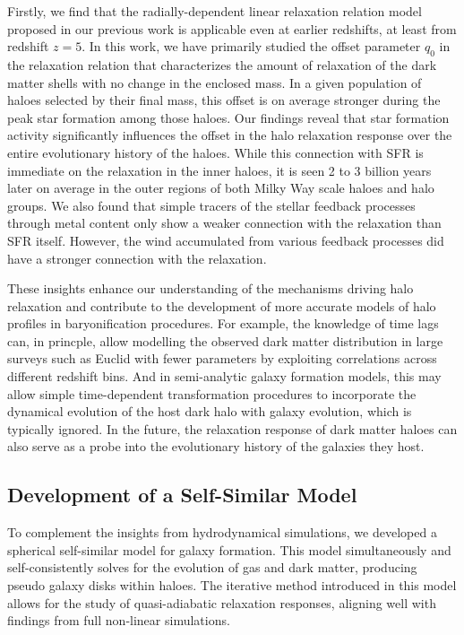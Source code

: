 Firstly, we find that the radially-dependent linear relaxation relation model proposed in our previous work is applicable even at earlier redshifts, at least from redshift $z=5$. In this work, we have primarily studied the offset parameter $q_0$ in the relaxation relation that characterizes the amount of relaxation of the dark matter shells with no change in the enclosed mass. In a given population of haloes selected by their final mass, this offset is on average stronger during the peak star formation among those haloes. 
Our findings reveal that star formation activity significantly influences the offset in the halo relaxation response  over the entire evolutionary history of the haloes. While this connection with SFR is immediate on the relaxation in the inner haloes, it is seen 2 to 3 billion years later on average in the outer regions of both Milky Way scale haloes and halo groups. 
We also found that simple tracers of the stellar feedback processes through metal content only show a weaker connection with the relaxation than SFR itself. However, the wind accumulated from various feedback processes did have a stronger connection with the relaxation.

These insights enhance our understanding of the mechanisms driving halo relaxation and contribute to the development of more accurate models of halo profiles in baryonification procedures. 
For example, the knowledge of time lags can, in princple, allow modelling the observed dark matter distribution in large surveys such as Euclid with fewer parameters by exploiting correlations across different redshift bins.
And in semi-analytic galaxy formation models, this %
may allow simple time-dependent transformation procedures to incorporate the dynamical evolution of the host dark halo with galaxy evolution, which is typically ignored. In the future, the relaxation response of dark matter haloes can also serve as a probe into the evolutionary history of the galaxies they host.

\subsection*{Development of a Self-Similar Model}
To complement the insights from hydrodynamical simulations, we developed a spherical self-similar model for galaxy formation. This model simultaneously and self-consistently solves for the evolution of gas and dark matter, producing pseudo galaxy disks within haloes. The iterative method introduced in this model allows for the study of quasi-adiabatic relaxation responses, aligning well with findings from full non-linear simulations.

